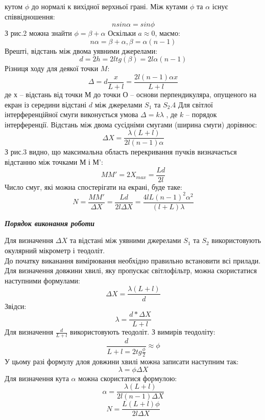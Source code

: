 кутом $\phi$ до нормалі к вихідної верхньої грані. Між кутами $\phi$ та $\alpha$ існує співвідношення:
$$nsin\alpha = sin\phi$$
З рис.2 можна знайти $\phi = \beta + \alpha$
Оскільки $a \approx 0$, маємо:
$$n\alpha = \beta + \alpha, \beta = \alpha(n-1)$$
Врешті, відстань між двома уявними джерелами:
$$d = 2h = 2l tg(\beta) = 2l \alpha(n-1)$$
Різниця ходу для деякої точки $M$:
$$\Delta = d\frac{x}{L+l} = \frac{2l(n-1)\alpha x}{L+l}$$
де $х$ – відстань від точки $М$ до точки $О$ – основи перпендикуляра, опущеного на екран із середини
відстані $d$ між джерелами $S_1$ та $S_2$.4 Для світлої інтерференційної смуги виконується умова $\Delta = k\lambda$ ,
де $k$ – порядок інтерференції. Відстань між двома сусідніми смугами (ширина смуги) дорівнює:
$$\Delta X = \frac{\lambda(L+l)}{2l(n-1)\alpha}$$
З рис.3 видно, що максимальна область перекривання пучків визначається відстанню між
точками М і М’:
$$MM' = 2X_{max} = \frac{Ld}{2l}$$
Число смуг, які можна спостерігати на екрані, буде таке:
$$N = \frac{MM'}{\Delta X} = \frac{Ld}{2l\Delta X} = \frac{4lL(n-1)^2 {\alpha}^2}{(l+L)\lambda}$$
\begin{center}
  {\textbf{\emph{Порядок виконання роботи}}}
\end{center}
\indent Для визначення $\Delta X$ та відстані між уявними джерелами $S_1$ та $S_2$ використовують окулярний мікрометр і теодоліт.\\
До початку виканання вимірювання необхідно правильно встановити всі прилади.\\
Для визначення довжини хвилі, яку пропускає світлофільтр, можна скористатися наступними формулами:
$$\Delta X = \frac{\lambda (L+l)}{d}$$
Звідси:
$$\lambda = \frac{d*\Delta X}{L+l}$$
Для визначення $\frac{d}{L+l}$ використовують теодоліт. З вимирів теодоліту:
$$\frac{d}{L+l = 2tg\frac{\phi}{2}} \approx \phi$$
У цьому разі формулу длоя довжини хвилі можна записати наступним так:
$$\lambda = \phi \Delta X$$
Для визначення кута $\alpha$ можна скористатися формулою:
$$\alpha = \frac{\lambda(L+l)}{2l(n-1)\Delta X}$$
$$N = \frac{L(L+l)\phi}{2l\Delta X}$$
